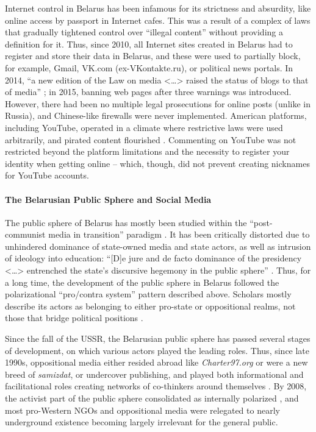 Internet control in Belarus has been infamous for its strictness and absurdity, like online access by passport in Internet cafes. This was a result of a complex of laws that gradually tightened control over “illegal content” without providing a definition for it. Thus, since 2010, all Internet sites created in Belarus had to register and store their data in Belarus, and these were used to partially block, for example, Gmail, VK.com (ex-VKontakte.ru), or political news portals. In 2014, “a new edition of the Law on media <…> raised the status of blogs to that of media” \cite[p.~15]{Shirokanova}; in 2015, banning web pages after three warnings was introduced. However, there had been no multiple legal prosecutions for online posts (unlike in Russia), and Chinese-like firewalls were never implemented. American platforms, including YouTube, operated in a climate where restrictive laws were used arbitrarily, and pirated content flourished \cite[p.~625]{Iosifidis}. Commenting on YouTube was not restricted beyond the platform limitations and the necessity to register your identity when getting online -- which, though, did not prevent creating nicknames for YouTube accounts.

\paragraph{The Belarusian Public Sphere and Social Media}
The public sphere of Belarus has mostly been studied within the “post-communist media in transition” paradigm \cite{Sparks}. It has been critically distorted due to unhindered dominance of state-owned media and state actors, as well as intrusion of ideology into education: “[D]e jure and de facto dominance of the presidency <…> entrenched the state’s discursive hegemony in the public sphere” \cite[p.~463]{Burkhardt}. Thus, for a long time, the development of the public sphere in Belarus followed the polarizational “pro/contra system” pattern described above. Scholars mostly describe its actors as belonging to either pro-state or oppositional realms, not those that bridge political positions \cite{Lesnikova,OhanaGenerale}.

Since the fall of the USSR, the Belarusian public sphere has passed several stages of development, on which various actors played the leading roles. Thus, since late 1990s, oppositional media either resided abroad like \textit{Charter97.org} or were a new breed of \textit{samizdat}, or undercover publishing, and played both informational and facilitational roles creating networks of co-thinkers around themselves \cite[p.~68]{Lesnikova}. By 2008, the activist part of the public sphere consolidated as internally polarized \cite{Jaromilek}, and most pro-Western NGOs and oppositional media were relegated to nearly underground existence \cite{OhanaGenerale} becoming largely irrelevant for the general public.

